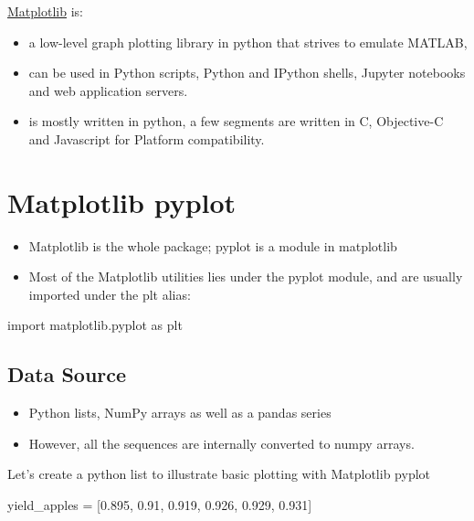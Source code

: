 \documentclass[
  letterpaper,
  DIV=11,
  numbers=noendperiod]{scrreprt}
\newenvironment{Shaded}{\begin{snugshade}}{\end{snugshade}}
\newcommand{\FloatTok}[1]{\textcolor[rgb]{0.68,0.00,0.00}{#1}}
\newcommand{\ImportTok}[1]{\textcolor[rgb]{0.00,0.46,0.62}{#1}}
\newcommand{\NormalTok}[1]{\textcolor[rgb]{0.00,0.23,0.31}{#1}}
\newcommand{\OperatorTok}[1]{\textcolor[rgb]{0.37,0.37,0.37}{#1}}
\providecommand{\tightlist}{%
  \setlength{\itemsep}{0pt}\setlength{\parskip}{0pt}}\usepackage{longtable,booktabs,array}
\begin{document}
\href{https://matplotlib.org/}{Matplotlib} is:

\begin{itemize}
\tightlist
\item
  a low-level graph plotting library in python that strives to emulate
  MATLAB,
\item
  can be used in Python scripts, Python and IPython shells, Jupyter
  notebooks and web application servers.
\item
  is mostly written in python, a few segments are written in C,
  Objective-C and Javascript for Platform compatibility.
\end{itemize}

\hypertarget{matplotlib-pyplot}{%
\section{Matplotlib pyplot}\label{matplotlib-pyplot}}

\begin{itemize}
\tightlist
\item
  Matplotlib is the whole package; pyplot is a module in matplotlib
\item
  Most of the Matplotlib utilities lies under the pyplot module, and are
  usually imported under the plt alias:
\end{itemize}

\begin{Shaded}
\begin{Highlighting}[]
\ImportTok{import}\NormalTok{ matplotlib.pyplot }\ImportTok{as}\NormalTok{ plt}
\end{Highlighting}
\end{Shaded}

\hypertarget{data-source}{%
\subsection{Data Source}\label{data-source}}

\begin{itemize}
\tightlist
\item
  Python lists, NumPy arrays as well as a pandas series
\item
  However, all the sequences are internally converted to numpy arrays.
\end{itemize}

Let's create a python list to illustrate basic plotting with Matplotlib
pyplot

\begin{Shaded}
\begin{Highlighting}[]
\NormalTok{yield\_apples }\OperatorTok{=}\NormalTok{ [}\FloatTok{0.895}\NormalTok{, }\FloatTok{0.91}\NormalTok{, }\FloatTok{0.919}\NormalTok{, }\FloatTok{0.926}\NormalTok{, }\FloatTok{0.929}\NormalTok{, }\FloatTok{0.931}\NormalTok{]}
\end{Highlighting}
\end{Shaded}
\end{document}
